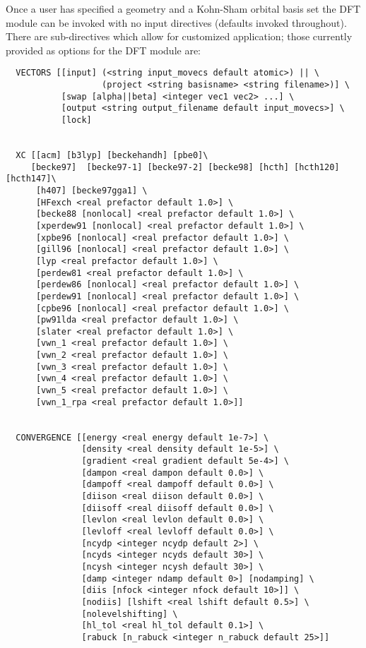 Once a user has specified a geometry and a Kohn-Sham orbital basis set
the DFT module can be invoked with no input directives (defaults 
invoked throughout).  There are sub-directives which allow for 
customized application; those currently provided as options for 
the DFT module are:
\begin{verbatim}
  VECTORS [[input] (<string input_movecs default atomic>) || \
                   (project <string basisname> <string filename>)] \
           [swap [alpha||beta] <integer vec1 vec2> ...] \
           [output <string output_filename default input_movecs>] \
           [lock]


  XC [[acm] [b3lyp] [beckehandh] [pbe0]\
     [becke97]  [becke97-1] [becke97-2] [becke98] [hcth] [hcth120] [hcth147]\
      [h407] [becke97gga1] \
      [HFexch <real prefactor default 1.0>] \
      [becke88 [nonlocal] <real prefactor default 1.0>] \
      [xperdew91 [nonlocal] <real prefactor default 1.0>] \
      [xpbe96 [nonlocal] <real prefactor default 1.0>] \
      [gill96 [nonlocal] <real prefactor default 1.0>] \
      [lyp <real prefactor default 1.0>] \
      [perdew81 <real prefactor default 1.0>] \
      [perdew86 [nonlocal] <real prefactor default 1.0>] \
      [perdew91 [nonlocal] <real prefactor default 1.0>] \
      [cpbe96 [nonlocal] <real prefactor default 1.0>] \
      [pw91lda <real prefactor default 1.0>] \
      [slater <real prefactor default 1.0>] \
      [vwn_1 <real prefactor default 1.0>] \
      [vwn_2 <real prefactor default 1.0>] \
      [vwn_3 <real prefactor default 1.0>] \
      [vwn_4 <real prefactor default 1.0>] \
      [vwn_5 <real prefactor default 1.0>] \
      [vwn_1_rpa <real prefactor default 1.0>]]


  CONVERGENCE [[energy <real energy default 1e-7>] \
               [density <real density default 1e-5>] \
               [gradient <real gradient default 5e-4>] \
               [dampon <real dampon default 0.0>] \
               [dampoff <real dampoff default 0.0>] \
               [diison <real diison default 0.0>] \
               [diisoff <real diisoff default 0.0>] \
               [levlon <real levlon default 0.0>] \
               [levloff <real levloff default 0.0>] \
               [ncydp <integer ncydp default 2>] \
               [ncyds <integer ncyds default 30>] \
               [ncysh <integer ncysh default 30>] \
               [damp <integer ndamp default 0>] [nodamping] \
               [diis [nfock <integer nfock default 10>]] \
               [nodiis] [lshift <real lshift default 0.5>] \
               [nolevelshifting] \
               [hl_tol <real hl_tol default 0.1>] \
               [rabuck [n_rabuck <integer n_rabuck default 25>]]



\end{verbatim}
